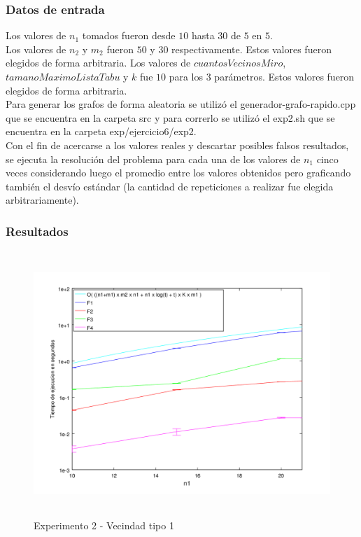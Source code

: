 \subsubsection*{Datos de entrada}\;
\noindent Los valores de $n_1$ tomados fueron desde $10$ hasta $30$ de $5$ en $5$. \\
       Los valores de $n_2$ y $m_2$ fueron $50$ y $30$ respectivamente. Estos valores fueron elegidos de forma arbitraria. Los valores de $cuantosVecinosMiro$, $tamanoMaximoListaTabu$ y $k$ fue $10$ para los $3$ parámetros.  Estos valores fueron elegidos de forma arbitraria. \\
        Para generar los grafos de forma aleatoria se utilizó el generador-grafo-rapido.cpp que se encuentra en la carpeta src y para correrlo se utilizó el exp2.sh que se encuentra en la carpeta exp/ejercicio6/exp2. \\
        Con el fin de acercarse a los valores reales y descartar posibles falsos resultados, se ejecuta la resolución del problema para cada una de los valores de $n_1$ cinco veces considerando luego el promedio entre los valores obtenidos pero graficando también el desvío estándar (la cantidad de repeticiones a realizar fue elegida arbitrariamente).\; 

\subsubsection*{Resultados}\;

    \begin{figure}[H]
      \includegraphics[height=10cm]{graficos/ejercicio6-exp2-tipo1.png}
       \caption{Experimento 2 - Vecindad tipo 1}
	\end{figure}

